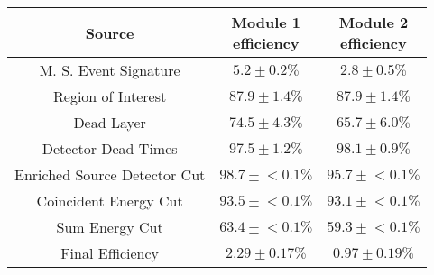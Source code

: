 \begin{tabular}{|c|c|c|}
\hline
  Source & \makecell{Module 1\\efficiency} & \makecell{Module 2\\efficiency} \\
\hline
  M. S. Event Signature & $5.2 \pm 0.2\%$ & $2.8 \pm 0.5\%$ \\
  Region of Interest & $87.9 \pm 1.4\%$ & $87.9 \pm 1.4\%$ \\
  Dead Layer & $74.5 \pm 4.3\%$ & $65.7 \pm 6.0\%$ \\
  Detector Dead Times & $97.5 \pm 1.2\%$ & $98.1 \pm 0.9\%$ \\
  Enriched Source Detector Cut & $98.7 \pm{}<\!0.1\%$ & $95.7 \pm{}<\!0.1\%$ \\
  Coincident Energy Cut & $93.5 \pm{}<\!0.1\%$ & $93.1 \pm{}<\!0.1\%$ \\
  Sum Energy Cut & $63.4 \pm{}<\!0.1\%$ & $59.3 \pm{}<\!0.1\%$ \\
  \hline Final Efficiency & $2.29 \pm 0.17\%$ & $0.97 \pm 0.19\%$ \\
\hline
\end{tabular}

